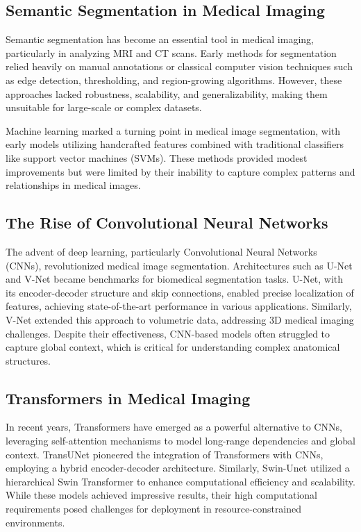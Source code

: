 \documentclass[journal]{IEEEtran}
\begin{document}
\subsection{Semantic Segmentation in Medical Imaging}

Semantic segmentation has become an essential tool in medical imaging, particularly in analyzing MRI and CT scans. Early methods for segmentation relied heavily on manual annotations or classical computer vision techniques such as edge detection, thresholding, and region-growing algorithms. However, these approaches lacked robustness, scalability, and generalizability, making them unsuitable for large-scale or complex datasets.

Machine learning marked a turning point in medical image segmentation, with early models utilizing handcrafted features combined with traditional classifiers like support vector machines (SVMs). These methods provided modest improvements but were limited by their inability to capture complex patterns and relationships in medical images.

\subsection{The Rise of Convolutional Neural Networks}

The advent of deep learning, particularly Convolutional Neural Networks (CNNs), revolutionized medical image segmentation. Architectures such as U-Net\cite{ronneberger2015unet} and V-Net\cite{milletari2016vnet} became benchmarks for biomedical segmentation tasks. U-Net, with its encoder-decoder structure and skip connections, enabled precise localization of features, achieving state-of-the-art performance in various applications. Similarly, V-Net extended this approach to volumetric data, addressing 3D medical imaging challenges. Despite their effectiveness, CNN-based models often struggled to capture global context, which is critical for understanding complex anatomical structures.

\subsection{Transformers in Medical Imaging}

In recent years, Transformers have emerged as a powerful alternative to CNNs, leveraging self-attention mechanisms to model long-range dependencies and global context. TransUNet\cite{chen2021transunet} pioneered the integration of Transformers with CNNs, employing a hybrid encoder-decoder architecture. Similarly, Swin-Unet\cite{cao2021swinunet} utilized a hierarchical Swin Transformer to enhance computational efficiency and scalability. While these models achieved impressive results, their high computational requirements posed challenges for deployment in resource-constrained environments.
\end{document}
